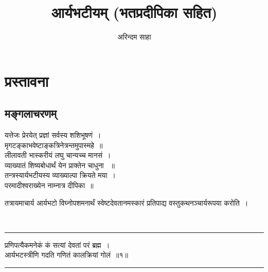\documentclass[12pt,a4paper]{report}
\author{अरिन्दम साहा}
\title{आर्यभटीयम् (भतप्रदीपिका सहित)}
\newenvironment{moola}
{
~\\
\hrule
\begin{center}
\begin{LARGE}
}
{
\end{LARGE}
\end{center}
\hrule
~\\
}
\begin{document}
\maketitle

\chapter{प्रस्तावना}

\section{मङ्गलाचरणम्}

\begin{center}
 \begin{large}
यत्तेजः प्रेरयेत् प्रज्ञां सर्वस्य शशिभूषणं~।\\
मृगटङ्काभवेष्टाङ्कत्रिनेत्रन्तमुपास्महे~॥\\
लीलावती भास्करीयं लघु चान्यच्च मानसं~।\\
व्याख्यातं शिष्यबोधार्थं येन प्राक्तेन चाधुना ~॥\\
तन्त्रस्यार्यभटीयस्य व्याख्याल्पा क्रियते मया~।\\
परमादीश्वराख्येन नाम्नात्र दीपिका~॥\\  
 \end{large}
\end{center}


तत्रायमाचार्य आर्यभटो विघ्नोपशमनार्थं स्वेष्टदेवतानमस्कारं प्रतिपाद्य वस्तुकथनञ्चार्यरूपया करोति~।

\begin{moola}
प्रणिपत्यैकमनेकं कं सत्यां देवतां परं ब्रह्म~।\\
आर्यभटस्त्रीणि गदति गणितं कालक्रियां गोलं~॥१॥\\
\end{moola}

\end{document}
